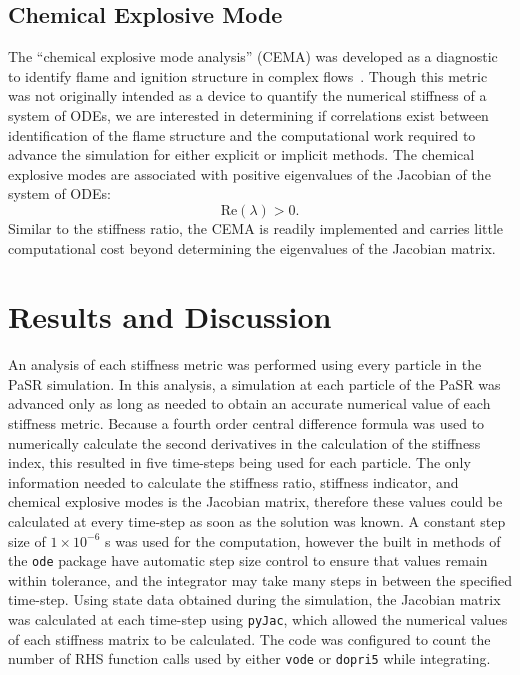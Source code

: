 \documentclass[12pt]{ussci}
\begin{document}
\subsection{Chemical Explosive Mode}
The ``chemical explosive mode analysis'' (CEMA) was developed as a diagnostic to identify flame and ignition structure in complex flows~\cite{Yoo2009}.
Though this metric was not originally intended as a device to quantify the numerical stiffness of a system of ODEs, we are interested in determining if correlations exist between identification of the flame structure and the computational work required to advance the simulation for either explicit or implicit methods.
The chemical explosive modes are associated with positive eigenvalues of the Jacobian of the system of ODEs:
\begin{equation}
	\textrm{Re}(\lambda) > 0.
\end{equation}
Similar to the stiffness ratio, the CEMA is readily implemented and carries little computational cost beyond determining the eigenvalues of the Jacobian matrix.

\section{Results and Discussion}

An analysis of each stiffness metric was performed using every particle in the PaSR simulation.
In this analysis, a simulation at each particle of the PaSR was advanced only as long as needed to obtain an accurate numerical value of each stiffness metric.
Because a fourth order central difference formula was used to numerically calculate the second derivatives in the calculation of the stiffness index, this resulted in five time-steps being used for each particle.
The only information needed to calculate the stiffness ratio, stiffness indicator, and chemical explosive modes is the Jacobian matrix, therefore these values could be calculated at every time-step as soon as the solution was known.
A constant step size of $1 \times 10^{-6}$ s was used for the computation, however the built in methods of the \texttt{ode} package have automatic step size control to ensure that values remain within tolerance, and the integrator may take many steps in between the specified time-step.
Using state data obtained during the simulation, the Jacobian matrix was calculated at each time-step using \texttt{pyJac}, which allowed the numerical values of each stiffness matrix to be calculated.
The code was configured to count the number of RHS function calls used by either \texttt{vode} or \texttt{dopri5} while integrating.
\end{document}
